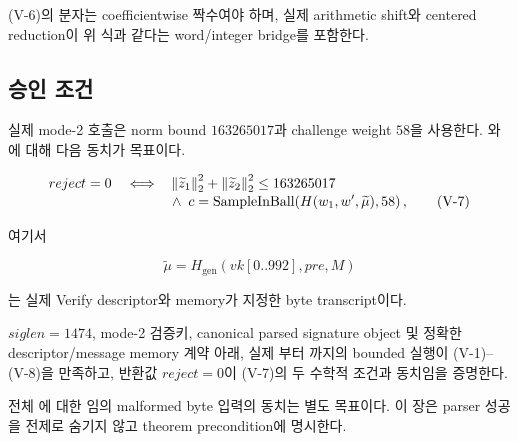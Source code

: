 \textup{(V-6)}의 분자는 coefficientwise 짝수여야 하며, 실제 arithmetic shift와
centered reduction이 위 식과 같다는 word/integer bridge를 포함한다.

\subsection{승인 조건}

실제 mode-2 호출은 norm bound \(163265017\)과 challenge weight \(58\)을
사용한다. 와
에 대해 다음 동치가 목표이다.

\begin{align}
reject=0 \quad\Longleftrightarrow\quad
&\left\lVert \widetilde z_1\right\rVert_2^2+
 \left\lVert \widetilde z_2\right\rVert_2^2\le 163265017
\notag\\[-0.2em]
&\land\;
c=\operatorname{SampleInBall}\!\left(
 H(w_1,w',\widetilde\mu),58
\right),
\tag{V-7}
\end{align}

여기서

\[
  \widetilde\mu=H_{\mathrm{gen}}(vk[0..992],pre,M)
  \tag{V-8}
\]

는 실제 Verify descriptor와 memory가 지정한 byte transcript이다.

\begin{verificationgoal}
\(siglen=1474\), mode-2 검증키, canonical parsed signature object 및 정확한
descriptor/message memory 계약 아래, 실제
부터
까지의 bounded 실행이
\textup{(V-1)}--\textup{(V-8)}을 만족하고, 반환값 \(reject=0\)이
\textup{(V-7)}의 두 수학적 조건과 동치임을 증명한다.
\end{verificationgoal}

전체 에 대한 임의 malformed byte 입력의 동치는 별도
목표이다. 이 장은 parser 성공을 전제로 숨기지 않고 theorem precondition에
명시한다.

